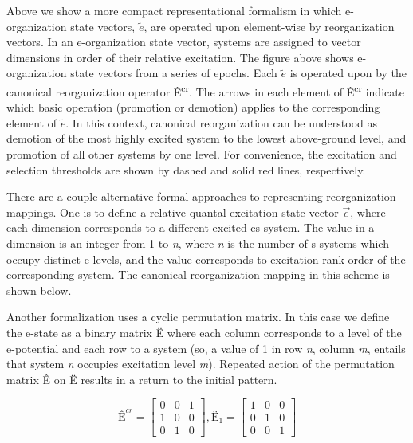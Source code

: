   Above we show a more compact representational formalism in which e-organization state vectors,  $\widetilde{{e}}$, are operated upon element-wise by reorganization vectors. In an e-organization state vector, systems are assigned to vector dimensions in order of their relative excitation. The figure above shows e-organization state vectors from a series of epochs. Each  $\widetilde{{e}}$ is operated upon by the canonical reorganization operator Ê\textsuperscript{cr}. The arrows in each element of Ê\textsuperscript{cr} indicate which basic operation (promotion or demotion) applies to the corresponding element of  $\widetilde{{e}}$. In this context, canonical reorganization can be understood as demotion of the most highly excited system to the lowest above-ground level, and promotion of all other systems by one level. For convenience, the excitation and selection thresholds are shown by dashed and solid red lines, respectively.

  There are a couple alternative formal approaches to representing reorganization mappings. One is to define a relative quantal excitation state vector  $\overrightarrow{{e}}$, where each dimension corresponds to a different excited cs-system. The value in a dimension is an integer from 1 to \textit{n}, where \textit{n} is the number of s-systems which occupy distinct e-levels, and the value corresponds to excitation rank order of the corresponding system. The canonical reorganization mapping in this scheme is shown below.


  Another formalization uses a cyclic permutation matrix. In this case we define the e-state as a binary matrix Ë where each column corresponds to a level of the e-potential and each row to a system (so, a value of 1 in row \textit{n}, column \textit{m}, entails that system \textit{n} occupies excitation level \textit{m}). Repeated action of the permutation matrix Ê on Ë results in a return to the initial pattern. 

\ea
$$
\text{Ê}^{{cr}}=
\left[
  \begin{matrix}
  0 & 0 & 1\\
  1 & 0 & 0\\
  0 & 1 & 0
  \end{matrix}
\right],
{\text{Ë}}_{1}=
\left[
  \begin{matrix}
  1 & 0 & 0\\
  0 & 1 & 0\\
  0 & 0 & 1
  \end{matrix}
\right]
$$
\z


